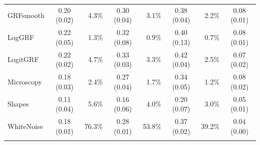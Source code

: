 \documentclass[al, 27pt, plainboxedsections, landscape]{sciposter}
\begin{document}
\begin{multicols}{3}
\begin{table}[t!]
{\begin{tabular}{lcrcrcrc}
 GRFsmooth		&	0.20	(0.02)	&	4.3\%	&	0.30	(0.04)	&	3.1\%	&	0.38	(0.04)	&	2.2\%	&	0.08	(0.01)	\\
 LogGRF			&	0.22	(0.05)	&	1.3\%	&	0.32	(0.08)	&	0.9\%	&	0.40	(0.13)	&	0.7\%	&	0.08	(0.01)	\\
 LogitGRF		&	0.22	(0.02)	&	4.7\%	&	0.33	(0.03)	&	3.3\%	&	0.42	(0.04)	&	2.5\%	&	0.07	(0.02)	\\
 Microscopy 	&	0.18	(0.03)	&	2.4\%	&	0.27	(0.04)	&	1.7\%	&	0.34	(0.05)	&	1.2\%	&	0.08	(0.02)	\\
 Shapes			&	0.11	(0.04)	&	5.6\%	&	0.16	(0.06)	&	4.0\%	&	0.20	(0.07)	&	3.0\%	&	0.05	(0.01)	\\
 WhiteNoise		&	0.18	(0.01)	&	76.3\%	&	0.28	(0.01)	&	53.8\%	&	0.37	(0.02)	&	39.2\%	&	0.04	(0.00)	\\
\hline\noalign{\smallskip}
 \end{tabular}}
\end{table}



\small
\end{multicols}
\end{document}
